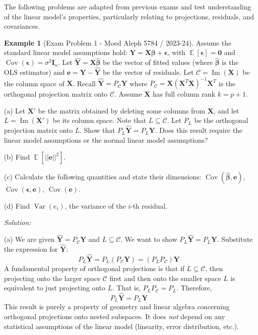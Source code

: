 \documentclass[11pt]{article}
\theoremstyle{definition}
\newtheorem{example}[theorem]{Example}
\theoremstyle{remark}
\DeclareMathOperator{\E}{\mathbb{E}}
\DeclareMathOperator{\Var}{\operatorname{Var}}
\DeclareMathOperator{\Cov}{\operatorname{Cov}}
\DeclareMathOperator{\im}{\operatorname{Im}} %
\begin{document}
The following problems are adapted from previous exams and test understanding of the linear model's properties, particularly relating to projections, residuals, and covariances.

\begin{example}[Exam Problem 1 - Moed Aleph 5784 / 2023-24] \label{ex:exam1}
Assume the standard linear model assumptions hold: $\bm{Y} = \bm{X}\bm{\beta} + \bm{\epsilon}$, with $\E[\bm{\epsilon}] = \mathbf{0}$ and $\Cov(\bm{\epsilon}) = \sigma^2 \bm{I}_n$. Let $\hat{\bm{Y}} = \bm{X}\hat{\bm{\beta}}$ be the vector of fitted values (where $\hat{\bm{\beta}}$ is the OLS estimator) and $\bm{e} = \bm{Y} - \hat{\bm{Y}}$ be the vector of residuals. Let $\mathcal{C} = \im(\bm{X})$ be the column space of $\bm{X}$. Recall $\hat{\bm{Y}} = P_{\mathcal{C}}\bm{Y}$ where $P_{\mathcal{C}} = \bm{X}(\bm{X}^T\bm{X})^{-1}\bm{X}^T$ is the orthogonal projection matrix onto $\mathcal{C}$. Assume $\bm{X}$ has full column rank $k = p+1$.

(a) Let $\bm{X}'$ be the matrix obtained by deleting some columns from $\bm{X}$, and let $L = \im(\bm{X}')$ be its column space. Note that $L \subseteq \mathcal{C}$. Let $P_L$ be the orthogonal projection matrix onto $L$. Show that $P_L \hat{\bm{Y}} = P_L \bm{Y}$. Does this result require the linear model assumptions or the normal linear model assumptions?

(b) Find $\E[||\bm{e}||^2]$.

(c) Calculate the following quantities and state their dimensions: $\Cov(\hat{\bm{\beta}}, \bm{e})$, $\Cov(\bm{\epsilon}, \bm{e})$, $\Cov(\bm{e})$.

(d) Find $\Var(e_i)$, the variance of the $i$-th residual.

\emph{Solution:}

(a) We are given $\hat{\bm{Y}} = P_{\mathcal{C}}\bm{Y}$ and $L \subseteq \mathcal{C}$. We want to show $P_L \hat{\bm{Y}} = P_L \bm{Y}$.
Substitute the expression for $\hat{\bm{Y}}$:
\[ P_L \hat{\bm{Y}} = P_L (P_{\mathcal{C}} \bm{Y}) = (P_L P_{\mathcal{C}}) \bm{Y} \]
A fundamental property of orthogonal projections is that if $L \subseteq \mathcal{C}$, then projecting onto the larger space $\mathcal{C}$ first and then onto the smaller space $L$ is equivalent to just projecting onto $L$. That is, $P_L P_{\mathcal{C}} = P_L$.
Therefore,
\[ P_L \hat{\bm{Y}} = P_L \bm{Y} \]
This result is purely a property of geometry and linear algebra concerning orthogonal projections onto nested subspaces. It does \emph{not} depend on any statistical assumptions of the linear model (linearity, error distribution, etc.).


\end{example}
\end{document}
